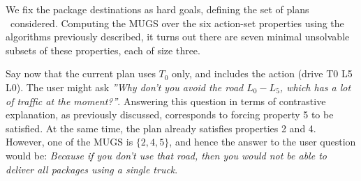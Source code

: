 We fix the package destinations as hard goals, defining the set of
plans \plans\ considered. Computing the MUGS over the six action-set
properties using the algorithms previously described, it turns out
there are seven minimal unsolvable subsets of these properties, each
of size three.

Say now that the current plan uses $T_0$ only, and includes the action
(drive T0 L5 L0). The user might ask \emph{''Why don't you avoid the
  road $L_0-L_5$, which has a lot of traffic at the
  moment?''}. Answering this question in terms of contrastive
explanation, as previously discussed, corresponds to forcing property
5 to be satisfied. At the same time, the plan already satisfies
properties 2 and 4. However, one of the MUGS is $\{2,4,5\}$, and hence
the answer to the user question would be: \textit{Because if you don't
  use that road, then you would not be able to deliver all packages
  using a single truck}.
